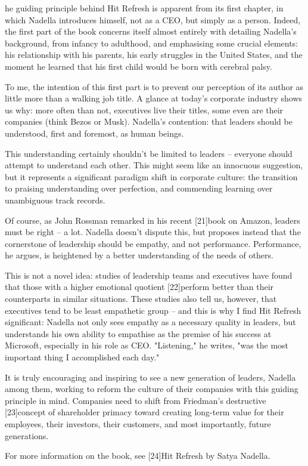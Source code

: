 \label{ch:hit-refresh}

he guiding principle behind Hit Refresh is apparent from its first
   chapter, in which Nadella introduces himself, not as a CEO, but simply
   as a person. Indeed, the first part of the book concerns itself almost
   entirely with detailing Nadella's background, from infancy to
   adulthood, and emphasising some crucial elements: his relationship with
   his parents, his early struggles in the United States, and the moment
   he learned that his first child would be born with cerebral palsy.

   To me, the intention of this first part is to prevent our perception of
   its author as little more than a walking job title. A glance at today's
   corporate industry shows us why: more often than not, executives live
   their titles, some even are their companies (think Bezos or Musk).
   Nadella's contention: that leaders should be understood, first and
   foremost, as human beings.

   This understanding certainly shouldn't be limited to leaders --
   everyone should attempt to understand each other. This might seem like
   an innocuous suggestion, but it represents a significant paradigm shift
   in corporate culture: the transition to praising understanding over
   perfection, and commending learning over unambiguous track records.

   Of course, as John Rossman remarked in his recent [21]book on Amazon,
   leaders must be right -- a lot. Nadella doesn't dispute this, but
   proposes instead that the cornerstone of leadership should be empathy,
   and not performance. Performance, he argues, is heightened by a better
   understanding of the needs of others.

   This is not a novel idea: studies of leadership teams and executives
   have found that those with a higher emotional quotient [22]perform
   better than their counterparts in similar situations. These studies
   also tell us, however, that executives tend to be least empathetic
   group -- and this is why I find Hit Refresh significant: Nadella not
   only sees empathy as a necessary quality in leaders, but understands
   his own ability to empathise as the premise of his success at
   Microsoft, especially in his role as CEO. "Listening," he writes, "was
   the most important thing I accomplished each day."

   It is truly encouraging and inspiring to see a new generation of
   leaders, Nadella among them, working to reform the culture of their
   companies with this guiding principle in mind. Companies need to shift
   from Friedman's destructive [23]concept of shareholder primacy toward
   creating long-term value for their employees, their investors, their
   customers, and most importantly, future generations.

   For more information on the book, see [24]Hit Refresh by Satya Nadella.
